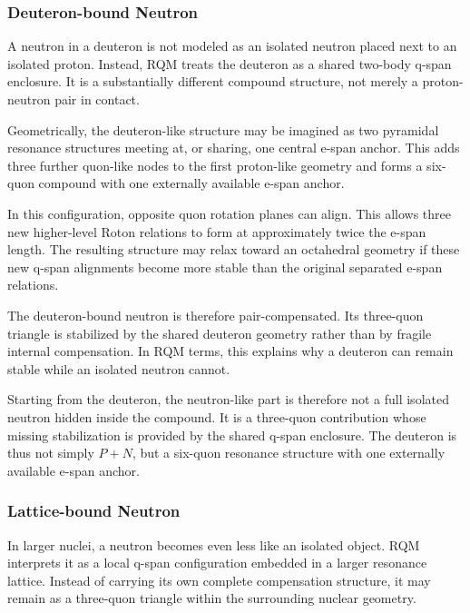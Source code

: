\documentclass[11pt,a4paper]{article}
\begin{document}

\subsubsection{Deuteron-bound Neutron}

A neutron in a deuteron is not modeled as an isolated neutron placed next to an isolated proton. Instead, RQM treats the deuteron as a shared two-body q-span enclosure. It is a substantially different compound structure, not merely a proton-neutron pair in contact.

Geometrically, the deuteron-like structure may be imagined as two pyramidal resonance structures meeting at, or sharing, one central e-span anchor. This adds three further quon-like nodes to the first proton-like geometry and forms a six-quon compound with one externally available e-span anchor.

In this configuration, opposite quon rotation planes can align. This allows three new higher-level Roton relations to form at approximately twice the e-span length. The resulting structure may relax toward an octahedral geometry if these new q-span alignments become more stable than the original separated e-span relations.

The deuteron-bound neutron is therefore pair-compensated. Its three-quon triangle is stabilized by the shared deuteron geometry rather than by fragile internal compensation. In RQM terms, this explains why a deuteron can remain stable while an isolated neutron cannot.

Starting from the deuteron, the neutron-like part is therefore not a full isolated neutron hidden inside the compound. It is a three-quon contribution whose missing stabilization is provided by the shared q-span enclosure. The deuteron is thus not simply \(P+N\), but a six-quon resonance structure with one externally available e-span anchor.



\subsubsection{Lattice-bound Neutron}

In larger nuclei, a neutron becomes even less like an isolated object. RQM interprets it as a local q-span configuration embedded in a larger resonance lattice. Instead of carrying its own complete compensation structure, it may remain as a three-quon triangle within the surrounding nuclear geometry.
\end{document}

